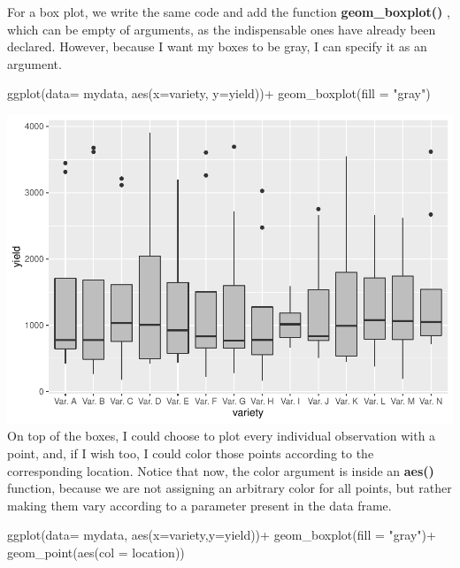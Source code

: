 \documentclass[
]{book}
\newenvironment{Shaded}{\begin{snugshade}}{\end{snugshade}}
\newcommand{\AttributeTok}[1]{\textcolor[rgb]{0.77,0.63,0.00}{#1}}
\newcommand{\FunctionTok}[1]{\textcolor[rgb]{0.00,0.00,0.00}{#1}}
\newcommand{\NormalTok}[1]{#1}
\newcommand{\SpecialCharTok}[1]{\textcolor[rgb]{0.00,0.00,0.00}{#1}}
\newcommand{\StringTok}[1]{\textcolor[rgb]{0.31,0.60,0.02}{#1}}
\begin{document}
For a box plot, we write the same code and add the function \textbf{geom\_boxplot() }, which can be empty of arguments, as the indispensable ones have already been declared. However, because I want my boxes to be gray, I can specify it as an argument.

\begin{Shaded}
\begin{Highlighting}[]
\FunctionTok{ggplot}\NormalTok{(}\AttributeTok{data=}\NormalTok{ mydata, }\FunctionTok{aes}\NormalTok{(}\AttributeTok{x=}\NormalTok{variety, }\AttributeTok{y=}\NormalTok{yield))}\SpecialCharTok{+}
  \FunctionTok{geom\_boxplot}\NormalTok{(}\AttributeTok{fill =} \StringTok{"gray"}\NormalTok{)}
\end{Highlighting}
\end{Shaded}

\includegraphics{PPB-Toolkit-for-R-and-R-Studio_files/figure-latex/unnamed-chunk-67-1.pdf}
On top of the boxes, I could choose to plot every individual observation with a point, and, if I wish too, I could color those points according to the corresponding location. Notice that now, the color argument is inside an \textbf{aes() } function, because we are not assigning an arbitrary color for all points, but rather making them vary according to a parameter present in the data frame.

\begin{Shaded}
\begin{Highlighting}[]
\FunctionTok{ggplot}\NormalTok{(}\AttributeTok{data=}\NormalTok{ mydata,  }\FunctionTok{aes}\NormalTok{(}\AttributeTok{x=}\NormalTok{variety,}\AttributeTok{y=}\NormalTok{yield))}\SpecialCharTok{+} 
  \FunctionTok{geom\_boxplot}\NormalTok{(}\AttributeTok{fill =} \StringTok{"gray"}\NormalTok{)}\SpecialCharTok{+} 
  \FunctionTok{geom\_point}\NormalTok{(}\FunctionTok{aes}\NormalTok{(}\AttributeTok{col =}\NormalTok{ location)) }
\end{Highlighting}
\end{Shaded}
\end{document}
